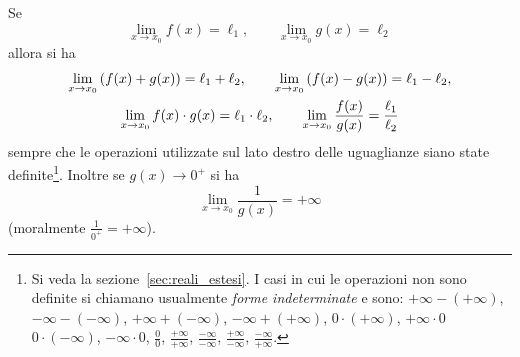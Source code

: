 \begin{theorem}
Se
\[
  \lim_{x\to x_0}f(x) = \ell_1,\qquad
  \lim_{x\to x_0}g(x) = \ell_2
\]
allora si ha
\begin{gather*}
  \lim_{x\to x_0} {\left( f(x) + g(x) \right)} = \ell_1 + \ell_2, \qquad
  \lim_{x\to x_0} {\left( f(x) - g(x) \right)} = \ell_1 - \ell_2, \\
  \lim_{x\to x_0} f(x)\cdot g(x) = \ell_1 \cdot \ell_2, \qquad
  \lim_{x\to x_0} \frac{f(x)}{g(x)} = \frac{\ell_1}{\ell_2}
\end{gather*}
sempre che le operazioni utilizzate sul lato destro delle uguaglianze
siano state definite\footnote{%
Si veda la sezione~\ref{sec:reali_estesi}.
I casi in cui le operazioni non sono definite si chiamano 
usualmente \emph{forme indeterminate}
e sono: $+\infty - (+\infty)$, 
$-\infty - (-\infty)$, $+\infty + (-\infty)$, 
$-\infty + (+\infty)$, $0\cdot (+\infty)$, $+\infty \cdot 0$
$0\cdot (-\infty)$, $-\infty \cdot 0$, $\frac 0 0$,
$\frac{+\infty}{+\infty}$, $\frac{-\infty}{-\infty}$,
$\frac{+\infty}{-\infty}$, $\frac{-\infty}{+\infty}$. 
}.
Inoltre se $g(x)\to 0^+$ 
si ha
\[
    \lim_{x\to x_0} \frac{1}{g(x)} = +\infty
\]
(moralmente $\frac{1}{0^+} = +\infty$).
\end{theorem}
%
